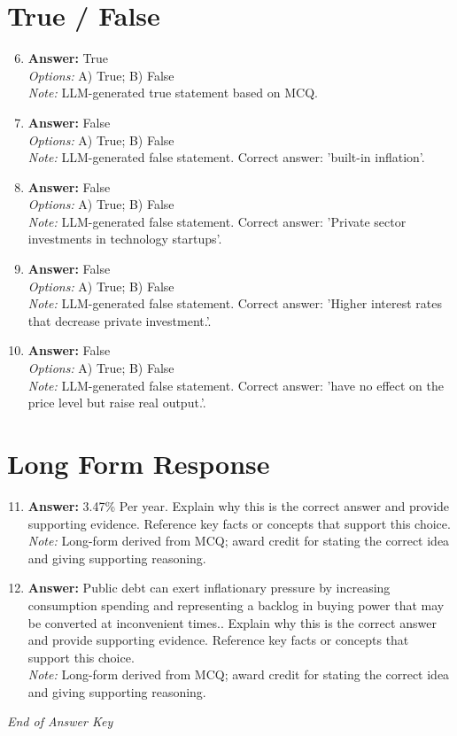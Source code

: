\documentclass[12pt]{article}
\begin{document}
\section*{True / False}
\begin{enumerate}[label=\arabic*.]
\setcounter{enumi}{5}
\item \textbf{Answer:} True
\\ \textit{Options:} A) True; B) False
\\ \textit{Note:} LLM-generated true statement based on MCQ.
\item \textbf{Answer:} False
\\ \textit{Options:} A) True; B) False
\\ \textit{Note:} LLM-generated false statement. Correct answer: 'built-in inflation'.
\item \textbf{Answer:} False
\\ \textit{Options:} A) True; B) False
\\ \textit{Note:} LLM-generated false statement. Correct answer: 'Private sector investments in technology startups'.
\item \textbf{Answer:} False
\\ \textit{Options:} A) True; B) False
\\ \textit{Note:} LLM-generated false statement. Correct answer: 'Higher interest rates that decrease private investment.'.
\item \textbf{Answer:} False
\\ \textit{Options:} A) True; B) False
\\ \textit{Note:} LLM-generated false statement. Correct answer: 'have no effect on the price level but raise real output.'.
\end{enumerate}

\section*{Long Form Response}
\begin{enumerate}[label=\arabic*.]
\setcounter{enumi}{10}
\item \textbf{Answer:} 3.47\% Per year. Explain why this is the correct answer and provide supporting evidence. Reference key facts or concepts that support this choice.
\\ \textit{Note:} Long-form derived from MCQ; award credit for stating the correct idea and giving supporting reasoning.
\item \textbf{Answer:} Public debt can exert inflationary pressure by increasing consumption spending and representing a backlog in buying power that may be converted at inconvenient times.. Explain why this is the correct answer and provide supporting evidence. Reference key facts or concepts that support this choice.
\\ \textit{Note:} Long-form derived from MCQ; award credit for stating the correct idea and giving supporting reasoning.
\end{enumerate}

\vfill
\noindent\textit{End of Answer Key}
\end{document}
